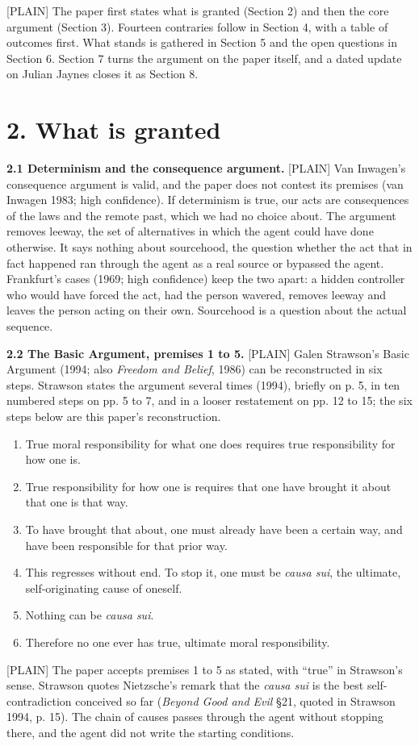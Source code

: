 \documentclass[11pt]{article}
\newcommand{\register}[1]{{\ttfamily\small #1}}
\begin{document}
\register{[PLAIN]} The paper first states what is granted (Section 2) and then the core argument (Section 3). Fourteen contraries follow in Section 4, with a table of outcomes first. What stands is gathered in Section 5 and the open questions in Section 6. Section 7 turns the argument on the paper itself, and a dated update on Julian Jaynes closes it as Section 8.

\section*{2. What is granted}

\textbf{2.1 Determinism and the consequence argument.} \register{[PLAIN]} Van Inwagen's consequence argument is valid, and the paper does not contest its premises (van Inwagen 1983; high confidence). If determinism is true, our acts are consequences of the laws and the remote past, which we had no choice about. The argument removes leeway, the set of alternatives in which the agent could have done otherwise. It says nothing about sourcehood, the question whether the act that in fact happened ran through the agent as a real source or bypassed the agent. Frankfurt's cases (1969; high confidence) keep the two apart: a hidden controller who would have forced the act, had the person wavered, removes leeway and leaves the person acting on their own. Sourcehood is a question about the actual sequence.

\textbf{2.2 The Basic Argument, premises 1 to 5.} \register{[PLAIN]} Galen Strawson's Basic Argument (1994; also \emph{Freedom and Belief}, 1986) can be reconstructed in six steps. Strawson states the argument several times (1994), briefly on p. 5, in ten numbered steps on pp. 5 to 7, and in a looser restatement on pp. 12 to 15; the six steps below are this paper's reconstruction.

\begin{enumerate}
\item True moral responsibility for what one does requires true responsibility for how one is.
\item True responsibility for how one is requires that one have brought it about that one is that way.
\item To have brought that about, one must already have been a certain way, and have been responsible for that prior way.
\item This regresses without end. To stop it, one must be \emph{causa sui}, the ultimate, self-originating cause of oneself.
\item Nothing can be \emph{causa sui}.
\item Therefore no one ever has true, ultimate moral responsibility.
\end{enumerate}
\register{[PLAIN]} The paper accepts premises 1 to 5 as stated, with ``true'' in Strawson's sense. Strawson quotes Nietzsche's remark that the \emph{causa sui} is the best self-contradiction conceived so far (\emph{Beyond Good and Evil} §21, quoted in Strawson 1994, p. 15). The chain of causes passes through the agent without stopping there, and the agent did not write the starting conditions.
\end{document}

